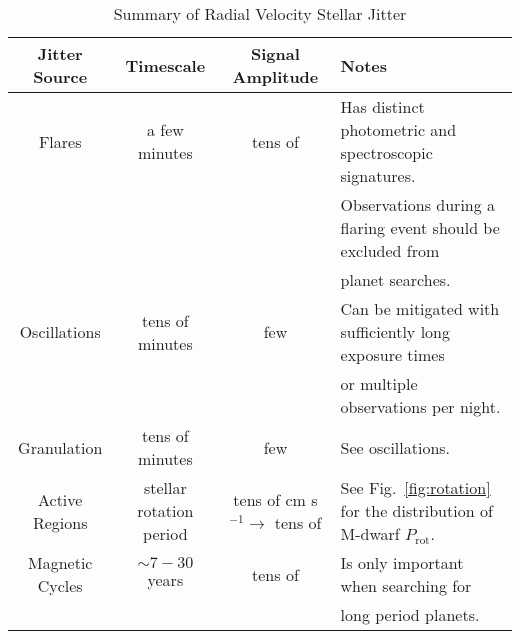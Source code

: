 \begin{table*}
\caption{Summary of Radial Velocity Stellar Jitter}
\label{table:jitter}
\begin{tabular}{cccl}
  \hline
  \hline
  \textbf{Jitter Source} & \textbf{Timescale} & \textbf{Signal Amplitude} & \textbf{Notes} \\
  \hline
  Flares & a few minutes & tens of \mps{} & Has distinct photometric and spectroscopic signatures. \\ 
  &&&Observations during a flaring event should be excluded from \\
  &&&planet searches. \\
  \hline
  Oscillations & tens of minutes & few \mps{} & Can be mitigated with sufficiently long exposure times \\
  &&&or multiple observations per night. \\
  \hline
  Granulation & tens of minutes & few \mps{} & See oscillations.  \\
  \hline
  Active Regions & stellar rotation period & tens of cm s$^{-1} \to$ tens of \mps{} & See Fig.~\ref{fig:rotation} for the distribution of M-dwarf $P_{\mathrm{rot}}$. \\
  \hline
  Magnetic Cycles & $\sim  7-30$ years & tens of \mps{} & Is only important when searching for \\
  &&&long period planets.
  \end{tabular}
\end{table*}
